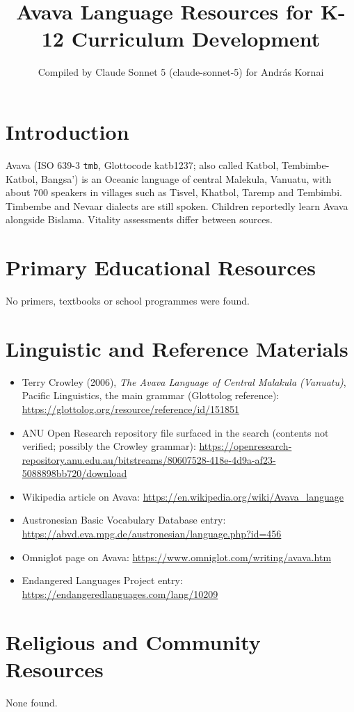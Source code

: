 \documentclass[12pt]{article}
\title{Avava Language Resources for K-12 Curriculum Development}
\author{Compiled by Claude Sonnet 5 (claude-sonnet-5) for Andr\'as Kornai}
\date{}
\begin{document}
\maketitle

\section{Introduction}
Avava (ISO 639-3 \texttt{tmb}, Glottocode katb1237; also called Katbol, Tembimbe-Katbol, Bangsa') is an Oceanic language of central Malekula, Vanuatu, with about 700 speakers in villages such as Tisvel, Khatbol, Taremp and Tembimbi. Timbembe and Nevaar dialects are still spoken. Children reportedly learn Avava alongside Bislama. Vitality assessments differ between sources.

\section{Primary Educational Resources}
No primers, textbooks or school programmes were found.

\section{Linguistic and Reference Materials}
\begin{itemize}
\item Terry Crowley (2006), \emph{The Avava Language of Central Malakula (Vanuatu)}, Pacific Linguistics, the main grammar (Glottolog reference): \url{https://glottolog.org/resource/reference/id/151851}
\item ANU Open Research repository file surfaced in the search (contents not verified; possibly the Crowley grammar): \url{https://openresearch-repository.anu.edu.au/bitstreams/80607528-418e-4d9a-af23-5088898bb720/download}
\item Wikipedia article on Avava: \url{https://en.wikipedia.org/wiki/Avava_language}
\item Austronesian Basic Vocabulary Database entry: \url{https://abvd.eva.mpg.de/austronesian/language.php?id=456}
\item Omniglot page on Avava: \url{https://www.omniglot.com/writing/avava.htm}
\item Endangered Languages Project entry: \url{https://endangeredlanguages.com/lang/10209}
\end{itemize}

\section{Religious and Community Resources}
None found.
\end{document}
